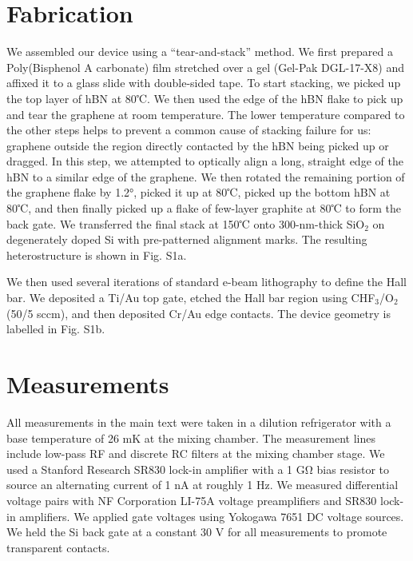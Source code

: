 \documentclass[12pt,twocolumn]{article}
\begin{document}
\section{Fabrication}
We assembled our device using a “tear-and-stack” method. We first prepared a Poly(Bisphenol A carbonate) film stretched over a gel (Gel-Pak DGL-17-X8) and affixed it to a glass slide with double-sided tape. To start stacking, we picked up the top layer of hBN at 80℃. We then used the edge of the hBN flake to pick up and tear the graphene at room temperature. The lower temperature compared to the other steps helps to prevent a common cause of stacking failure for us: graphene outside the region directly contacted by the hBN being picked up or dragged. In this step, we attempted to optically align a long, straight edge of the hBN to a similar edge of the graphene. We then rotated the remaining portion of the graphene flake by 1.2°, picked it up at 80℃, picked up the bottom hBN at 80℃, and then finally picked up a flake of few-layer graphite at 80℃  to form the back gate. We transferred the final stack at 150℃ onto 300-nm-thick SiO$_2$ on degenerately doped Si with pre-patterned alignment marks. The resulting heterostructure is shown in Fig. S1a.

We then used several iterations of standard e-beam lithography to define the Hall bar. We deposited a Ti/Au top gate, etched the Hall bar region using CHF$_3$/O$_2$ (50/5 sccm), and then deposited Cr/Au edge contacts. The device geometry is labelled in Fig. S1b.

\section{Measurements}
All measurements in the main text were taken in a dilution refrigerator with a base temperature of 26 mK at the mixing chamber. The measurement lines include low-pass RF and discrete RC filters at the mixing chamber stage. We used a Stanford Research SR830 lock-in amplifier with a 1 GΩ bias resistor to source an alternating current of 1 nA at roughly 1 Hz. We measured differential voltage pairs with NF Corporation LI-75A voltage preamplifiers and SR830 lock-in amplifiers. We applied gate voltages using Yokogawa 7651 DC voltage sources. We held the Si back gate at a constant 30 V for all measurements to promote transparent contacts.
\end{document}
